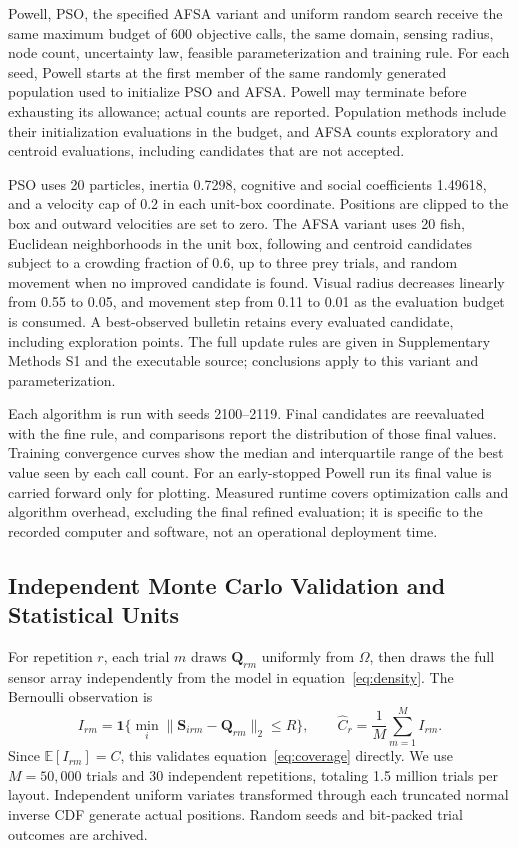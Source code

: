 \documentclass[fleqn,10pt]{wlscirep}
\newcommand{\E}{\mathbb{E}}
\begin{document}
Powell, PSO, the specified AFSA variant and uniform random search receive the same maximum budget of 600 objective calls, the same domain, sensing radius, node count, uncertainty law, feasible parameterization and training rule. For each seed, Powell starts at the first member of the same randomly generated population used to initialize PSO and AFSA. Powell may terminate before exhausting its allowance; actual counts are reported. Population methods include their initialization evaluations in the budget, and AFSA counts exploratory and centroid evaluations, including candidates that are not accepted.

PSO uses 20 particles, inertia 0.7298, cognitive and social coefficients 1.49618, and a velocity cap of 0.2 in each unit-box coordinate. Positions are clipped to the box and outward velocities are set to zero. The AFSA variant uses 20 fish, Euclidean neighborhoods in the unit box, following and centroid candidates subject to a crowding fraction of 0.6, up to three prey trials, and random movement when no improved candidate is found. Visual radius decreases linearly from 0.55 to 0.05, and movement step from 0.11 to 0.01 as the evaluation budget is consumed. A best-observed bulletin retains every evaluated candidate, including exploration points. The full update rules are given in Supplementary Methods S1 and the executable source; conclusions apply to this variant and parameterization.

Each algorithm is run with seeds 2100--2119. Final candidates are reevaluated with the fine rule, and comparisons report the distribution of those final values. Training convergence curves show the median and interquartile range of the best value seen by each call count. For an early-stopped Powell run its final value is carried forward only for plotting. Measured runtime covers optimization calls and algorithm overhead, excluding the final refined evaluation; it is specific to the recorded computer and software, not an operational deployment time.

\subsection*{Independent Monte Carlo Validation and Statistical Units}
For repetition $r$, each trial $m$ draws $\mathbf Q_{rm}$ uniformly from $\Omega$, then draws the full sensor array independently from the model in equation~\eqref{eq:density}. The Bernoulli observation is
\begin{equation}\label{eq:mc}
I_{rm}=\mathbf 1\{\min_i\|\mathbf S_{irm}-\mathbf Q_{rm}\|_2\le R\},\qquad
\widehat C_r=\frac{1}{M}\sum_{m=1}^M I_{rm}.
\end{equation}
Since $\E[I_{rm}]=C$, this validates equation~\eqref{eq:coverage} directly. We use $M=50{,}000$ trials and 30 independent repetitions, totaling 1.5 million trials per layout. Independent uniform variates transformed through each truncated normal inverse CDF generate actual positions. Random seeds and bit-packed trial outcomes are archived.
\end{document}
